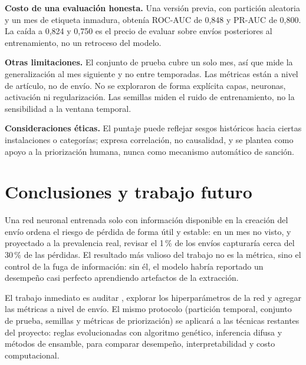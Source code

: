 \documentclass[conference]{IEEEtran}
\newcommand{\col}[1]{\texttt{\detokenize{#1}}}
\begin{document}
\textbf{Costo de una evaluación honesta.} Una versión previa, con partición
aleatoria y un mes de etiqueta inmadura, obtenía ROC-AUC de 0,848 y PR-AUC de
0,800. La caída a 0,824 y 0,750 es el precio de evaluar sobre envíos
posteriores al entrenamiento, no un retroceso del modelo.

\textbf{Otras limitaciones.} El conjunto de prueba cubre un solo mes, así que
mide la generalización al mes siguiente y no entre temporadas. Las métricas
están a nivel de artículo, no de envío. No se exploraron de forma explícita
capas, neuronas, activación ni regularización. Las semillas miden el ruido de
entrenamiento, no la sensibilidad a la ventana temporal.

\textbf{Consideraciones éticas.} El puntaje puede reflejar sesgos históricos
hacia ciertas instalaciones o categorías; expresa correlación, no causalidad,
y se plantea como apoyo a la priorización humana, nunca como mecanismo
automático de sanción.

\section{Conclusiones y trabajo futuro}

Una red neuronal entrenada solo con información disponible en la creación del
envío ordena el riesgo de pérdida de forma útil y estable: en un mes no visto,
y proyectado a la prevalencia real, revisar el 1\,\% de los envíos capturaría
cerca del 30\,\% de las pérdidas. El
resultado más valioso del trabajo no es la métrica, sino el control de la fuga
de información: sin él, el modelo habría reportado un desempeño casi perfecto
aprendiendo artefactos de la extracción.

El trabajo inmediato es auditar \col{DOM_DOMAIN_ID}, explorar los
hiperparámetros de la red y agregar las métricas a nivel de envío. El mismo
protocolo (partición temporal, conjunto de prueba, semillas y métricas de
priorización) se aplicará a las técnicas restantes del proyecto: reglas
evolucionadas con algoritmo genético, inferencia difusa y métodos de ensamble,
para comparar desempeño, interpretabilidad y costo computacional.
\end{document}
